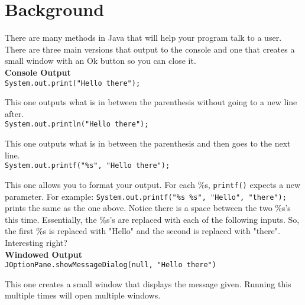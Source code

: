 \documentclass{report}
\begin{document}
\section{Background}
\hspace{2em}\large{There are many methods in Java that will help your program talk to a user. There are three main versions that output to the console and one that creates a small window with an Ok button so you can close it.\\

\textbf{Console Output}\hrulefill\\

\texttt{System.out.print("Hello there");}

\hspace{2em}This one outputs what is in between the parenthesis without going to a new line after.\\

\texttt{System.out.println("Hello there");}

\hspace{2em}This one outputs what is in between the parenthesis and then goes to the next line.\\

\texttt{System.out.printf("\%s", "Hello there");}

\hspace{2em}This one allows you to format your output. For each \%s, \texttt{printf()} expects a new parameter. For example:
\texttt{System.out.printf("\%s \%s", "Hello", "there");}\\
prints the same as the one above. Notice there is a space between the two \%s's this time. Essentially, the \%s's are replaced with each of the following inputs. So, the first \%s is replaced with "Hello" and the second is replaced with "there". Interesting right?\\

\textbf{Windowed Output}\hrulefill\\

\texttt{JOptionPane.showMessageDialog(null, "Hello there")}
 
\hspace{2em}This one creates a small window that displays the message given. Running this multiple times will open multiple windows.\\
}

\normalsize{}
\newpage
\end{document}
